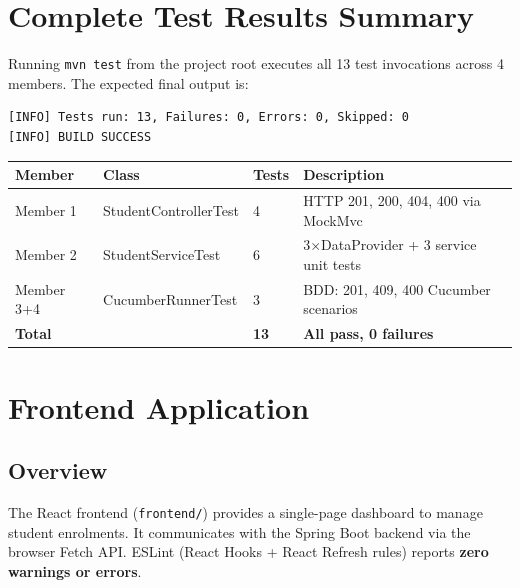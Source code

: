 \documentclass[12pt,a4paper]{article}
\begin{document}
\section{Complete Test Results Summary}

Running \texttt{mvn test} from the project root executes all 13 test invocations
across 4 members. The expected final output is:

\begin{lstlisting}[style=shellStyle, numbers=none, caption={Expected final mvn test output}]
[INFO] Tests run: 13, Failures: 0, Errors: 0, Skipped: 0
[INFO] BUILD SUCCESS
\end{lstlisting}

\begin{tabularx}{\textwidth}{lllX}
\toprule
\textbf{Member} & \textbf{Class} & \textbf{Tests} & \textbf{Description} \\
\midrule
Member 1 & StudentControllerTest & 4 & HTTP 201, 200, 404, 400 via MockMvc \\
Member 2 & StudentServiceTest    & 6 & 3$\times$DataProvider + 3 service unit tests \\
Member 3+4 & CucumberRunnerTest  & 3 & BDD: 201, 409, 400 Cucumber scenarios \\
\midrule
\multicolumn{2}{l}{\textbf{Total}} & \textbf{13} & \textbf{All pass, 0 failures} \\
\bottomrule
\end{tabularx}

\section{Frontend Application}

\subsection{Overview}

The React frontend (\texttt{frontend/}) provides a single-page dashboard to manage student
enrolments. It communicates with the Spring Boot backend via the browser Fetch API.
ESLint (React Hooks + React Refresh rules) reports \textbf{zero warnings or errors}.
\end{document}
